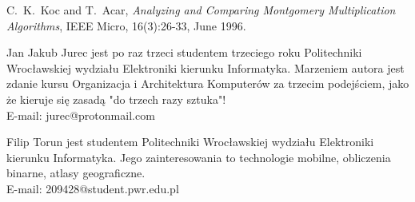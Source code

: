 \documentclass[10pt,journal,compsoc]{IEEEtran}
\begin{document}
\begin{thebibliography}{1}

C.~K.~Koc and T.~Acar, \emph{Analyzing and Comparing Montgomery Multiplication Algorithms}, IEEE Micro, 16(3):26-33, June 1996.

\end{thebibliography}
\begin{IEEEbiography}{Jan Jakub Jurec} jest po raz trzeci studentem trzeciego roku Politechniki Wrocławskiej wydziału Elektroniki kierunku Informatyka. Marzeniem autora jest zdanie kursu Organizacja i Architektura Komputerów za trzecim podejściem, jako że kieruje się zasadą "do trzech razy sztuka"! \\
E-mail: jurec@protonmail.com
\end{IEEEbiography}


\begin{IEEEbiography}{Filip Torun}
jest studentem Politechniki Wrocławskiej wydziału Elektroniki kierunku Informatyka. Jego zainteresowania to technologie mobilne, obliczenia binarne, atlasy geograficzne.\\
E-mail: 209428@student.pwr.edu.pl
\end{IEEEbiography}

\vfill
\end{document}
